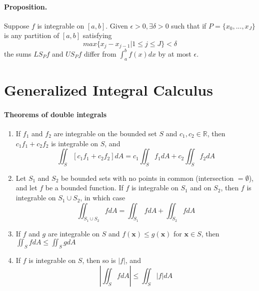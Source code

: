 \documentclass[11pt]{article}
\newcommand{\bx}[0]{\mathbf{x}}
\newcommand{\real}[0]{\mathbb{R}}
\begin{document}
\paragraph{Proposition.} Suppose $f$ is integrable on $[a,b]$. Given $\epsilon>0, \exists \delta > 0$ such that if $P= \{x_0,...,x_J\}$ is any partition of $[a,b]$ satisfying
\begin{equation*}
    max\{x_j-x_{j-1} | 1\leq j \leq J\} < \delta
\end{equation*}
the sums $LS_Pf$ and $US_Pf$ differ from $\int_a^bf(x)dx$ by at most $\epsilon$.

\section{Generalized Integral Calculus}
\paragraph{Theorems of double integrals}
\begin{enumerate}
    \item If $f_1$ and $f_2$ are integrable on the bounded set $S$ and $c_1,c_2\in \real$, then $c_1f_1 + c_2f_2$ is integrable on $S$, and
    \begin{equation*}
        \iint_S[c_1f_1 + c_2f_2]dA = c_1\iint_Sf_1dA + c_2\iint_Sf_2dA
    \end{equation*}
    
    \item Let $S_1$ and $S_2$ be bounded sets with no points in common (intersection $ =\emptyset$), and let $f$ be a bounded function. If $f$ is integrable on $S_1$ and on $S_2$, then $f$ is integrable on $S_1\cup S_2$, in which case
    \begin{equation*}
        \iint_{S_1\cup S_2}fdA = \iint_{S_1}fdA + \iint_{S_2} fdA
    \end{equation*}
    
    \item If $f$ and $g$ are integrable on $S$ and $f(\mathbf{x})\leq g(\mathbf{x})$ for $\bx \in S$, then $\iint_S fdA \leq \iint_S g dA$
    
    \item If $f$ is integrable on $S$, then so is $|f|$, and
    \begin{equation*}
        \left|\iint_Sf dA\right| \leq \iint_S|f|dA
    \end{equation*}
\end{enumerate}
\end{document}

